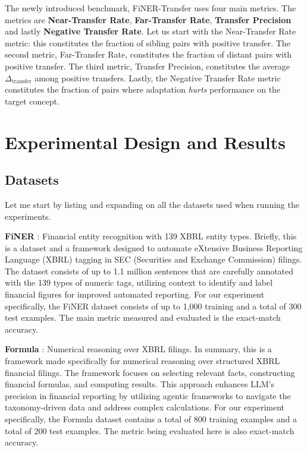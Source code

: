 \documentclass[12pt,a4paper,oneside]{article}
\begin{document}
The newly introduced benchmark, FiNER-Transfer uses four main metrics. The metrics are \textbf{Near-Transfer Rate}, \textbf{Far-Transfer Rate}, \textbf{Transfer Precision} and lastly \textbf{Negative Transfer Rate}. Let us start with the Near-Transfer Rate metric: this constitutes the fraction of sibling pairs with positive transfer. The second metric, Far-Transfer Rate, constitutes the fraction of distant pairs with positive transfer. The third metric, Transfer Precision, constitutes the average $\Delta_{\text{transfer}}$ among positive transfers. Lastly, the Negative Transfer Rate metric constitutes the fraction of pairs where adaptation \textit{hurts} performance on the target concept.

\section{Experimental Design and Results}
\label{sec:experiments}

\subsection{Datasets}

Let me start by listing and expanding on all the datasets used when running the experiments.

\textbf{FiNER} \citep{loukas2022finer}: Financial entity recognition with 139 XBRL entity types. Briefly, this is a dataset and a framework designed to automate eXtensive Business Reporting Language (XBRL) tagging in SEC (Securities and Exchange Commission) filings. The dataset consists of up to 1.1 million sentences that are carefully annotated with the 139 types of numeric tags, utilizing context to identify and label financial figures for improved automated reporting. For our experiment specifically, the FiNER dataset consists of up to 1,000 training and a total of 300 test examples. The main metric measured and evaluated is the exact-match accuracy.

\textbf{Formula} \citep{wang2025finlora}: Numerical reasoning over XBRL filings. In summary, this is a framework made specifically for numerical reasoning over structured XBRL financial filings. The framework focuses on selecting relevant facts, constructing financial formulas, and computing results. This approach enhances LLM's precision in financial reporting by utilizing agentic frameworks to navigate the taxonomy-driven data and address complex calculations. For our experiment specifically, the Formula dataset contains a total of 800 training examples and a total of 200 test examples. The metric being evaluated here is also exact-match accuracy.
\end{document}
